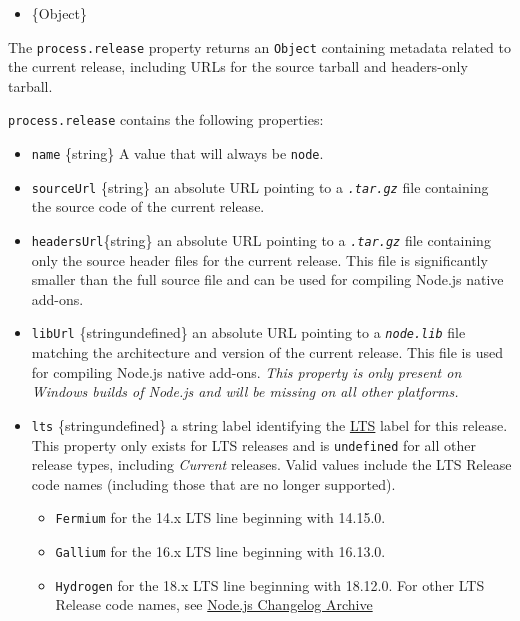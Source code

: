 \begin{itemize}
\tightlist
\item
  \{Object\}
\end{itemize}

The \texttt{process.release} property returns an \texttt{Object}
containing metadata related to the current release, including URLs for
the source tarball and headers-only tarball.

\texttt{process.release} contains the following properties:

\begin{itemize}
\tightlist
\item
  \texttt{name} \{string\} A value that will always be
  \texttt{\textquotesingle{}node\textquotesingle{}}.
\item
  \texttt{sourceUrl} \{string\} an absolute URL pointing to a
  \emph{\texttt{.tar.gz}} file containing the source code of the current
  release.
\item
  \texttt{headersUrl}\{string\} an absolute URL pointing to a
  \emph{\texttt{.tar.gz}} file containing only the source header files
  for the current release. This file is significantly smaller than the
  full source file and can be used for compiling Node.js native add-ons.
\item
  \texttt{libUrl} \{string\textbar undefined\} an absolute URL pointing
  to a \emph{\texttt{node.lib}} file matching the architecture and
  version of the current release. This file is used for compiling
  Node.js native add-ons. \emph{This property is only present on Windows
  builds of Node.js and will be missing on all other platforms.}
\item
  \texttt{lts} \{string\textbar undefined\} a string label identifying
  the \href{https://github.com/nodejs/Release}{LTS} label for this
  release. This property only exists for LTS releases and is
  \texttt{undefined} for all other release types, including
  \emph{Current} releases. Valid values include the LTS Release code
  names (including those that are no longer supported).

  \begin{itemize}
  \tightlist
  \item
    \texttt{\textquotesingle{}Fermium\textquotesingle{}} for the 14.x
    LTS line beginning with 14.15.0.
  \item
    \texttt{\textquotesingle{}Gallium\textquotesingle{}} for the 16.x
    LTS line beginning with 16.13.0.
  \item
    \texttt{\textquotesingle{}Hydrogen\textquotesingle{}} for the 18.x
    LTS line beginning with 18.12.0. For other LTS Release code names,
    see
    \href{https://github.com/nodejs/node/blob/HEAD/doc/changelogs/CHANGELOG_ARCHIVE.md}{Node.js
    Changelog Archive}
  \end{itemize}
\end{itemize}


